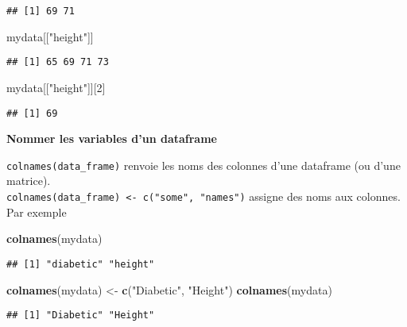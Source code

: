 \documentclass[]{book}
\newenvironment{Shaded}{\begin{snugshade}}{\end{snugshade}}
\newcommand{\DecValTok}[1]{\textcolor[rgb]{0.00,0.00,0.81}{#1}}
\newcommand{\KeywordTok}[1]{\textcolor[rgb]{0.13,0.29,0.53}{\textbf{#1}}}
\newcommand{\NormalTok}[1]{#1}
\newcommand{\StringTok}[1]{\textcolor[rgb]{0.31,0.60,0.02}{#1}}
\begin{document}
\begin{verbatim}
## [1] 69 71
\end{verbatim}

\begin{Shaded}
\begin{Highlighting}[]
\NormalTok{mydata[[}\StringTok{"height"}\NormalTok{]]}
\end{Highlighting}
\end{Shaded}

\begin{verbatim}
## [1] 65 69 71 73
\end{verbatim}

\begin{Shaded}
\begin{Highlighting}[]
\NormalTok{mydata[[}\StringTok{"height"}\NormalTok{]][}\DecValTok{2}\NormalTok{]}
\end{Highlighting}
\end{Shaded}

\begin{verbatim}
## [1] 69
\end{verbatim}

\textbf{Nommer les variables d'un dataframe}

\texttt{colnames(data\_frame)} renvoie les noms des colonnes d'une dataframe (ou d'une matrice).\\
\texttt{colnames(data\_frame)\ \textless{}-\ c("some",\ "names")} assigne des noms aux colonnes.\\
Par exemple

\begin{Shaded}
\begin{Highlighting}[]
\KeywordTok{colnames}\NormalTok{(mydata)}
\end{Highlighting}
\end{Shaded}

\begin{verbatim}
## [1] "diabetic" "height"
\end{verbatim}

\begin{Shaded}
\begin{Highlighting}[]
\KeywordTok{colnames}\NormalTok{(mydata) <-}\StringTok{ }\KeywordTok{c}\NormalTok{(}\StringTok{"Diabetic"}\NormalTok{, }\StringTok{"Height"}\NormalTok{)}
\KeywordTok{colnames}\NormalTok{(mydata)}
\end{Highlighting}
\end{Shaded}

\begin{verbatim}
## [1] "Diabetic" "Height"
\end{verbatim}
\end{document}
